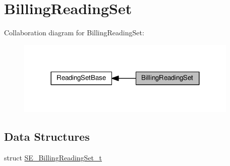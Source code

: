 \hypertarget{group__BillingReadingSet}{}\section{Billing\+Reading\+Set}
\label{group__BillingReadingSet}
Collaboration diagram for Billing\+Reading\+Set\+:\nopagebreak
\begin{figure}[H]
\begin{center}
\leavevmode
\includegraphics[width=300pt]{group__BillingReadingSet}
\end{center}
\end{figure}
\subsection*{Data Structures}
\begin{DoxyCompactItemize}
\item 
struct \hyperlink{structSE__BillingReadingSet__t}{S\+E\+\_\+\+Billing\+Reading\+Set\+\_\+t}
\end{DoxyCompactItemize}
